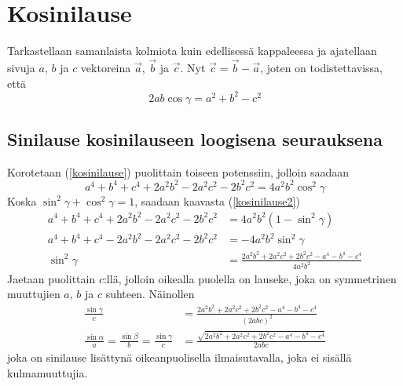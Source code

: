 \documentclass[a4paper,12pt]{amsart}
\begin{document}
\section{Kosinilause}
Tarkastellaan samanlaista kolmiota kuin edellisessä kappaleessa ja ajatellaan sivuja $a$, $b$ ja $c$ vektoreina $\vec{a}$, $\vec{b}$ ja $\vec{c}$. Nyt $\vec{c}=\vec{b}-\vec{a}$, joten on todistettavissa, että
\begin{equation}\label{kosinilause}
2ab\cos\gamma=a^2+b^2-c^2
\end{equation}
\subsection{Sinilause kosinilauseen loogisena seurauksena}
Korotetaan (\ref{kosinilause}) puolittain toiseen potenssiin, jolloin saadaan
\begin{equation}\label{kosinilause2}
a^4+b^4+c^4+2a^2 b^2-2a^2 c^2-2b^2 c^2=4a^2 b^2\cos^2\gamma
\end{equation}
Koska $\sin^2\gamma+\cos^2\gamma=1$, saadaan kaavasta (\ref{kosinilause2})
\begin{equation}\label{sini2}
\begin{split}
a^4+b^4+c^4+2a^2 b^2-2a^2 c^2-2b^2 c^2&= 4a^2 b^2(1-\sin^2\gamma)\\
a^4+b^4+c^4-2a^2 b^2-2a^2 c^2-2b^2 c^2&= -4a^2 b^2\sin^2\gamma \\
\sin^2\gamma&= \frac{2a^2 b^2+2a^2 c^2+2b^2 c^2-a^4-b^4-c^4}{4a^2 b^2}
\end{split}
\end{equation}
Jaetaan puolittain $c$:llä, jolloin oikealla puolella on lauseke, joka on symmetrinen muuttujien $a$, $b$ ja $c$ suhteen. Näinollen
\begin{equation}
\begin{split}
\frac{\sin\gamma}{c}&= \frac{2a^2 b^2+2a^2 c^2+2b^2 c^2-a^4-b^4-c^4}{(2abc)^2} \\
\frac{\sin\alpha}{a}=\frac{\sin\beta}{b}=\frac{\sin\gamma}{c}&=
\frac{\sqrt{2a^2 b^2+2a^2 c^2+2b^2 c^2-a^4-b^4-c^4}}{2abc}
\end{split}
\end{equation}
joka on sinilause lisättynä oikeanpuolisella ilmaisutavalla, joka ei sisällä kulmamuuttujia.
\end{document}
